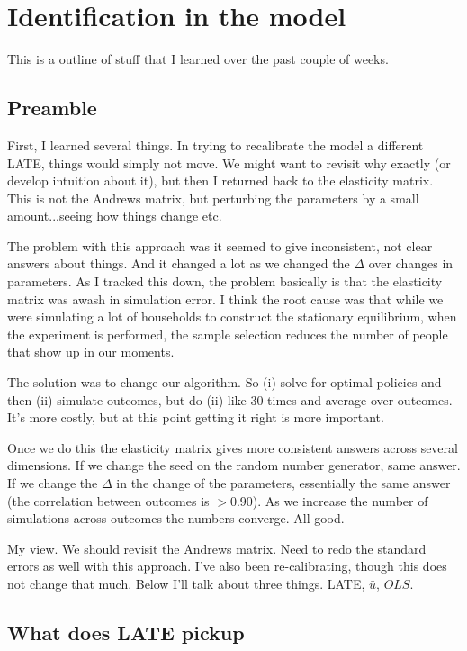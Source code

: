 \documentclass[pdftex,11pt]{article}
\begin{document}
\section{Identification in the model}

This is a outline of stuff that I learned over the past couple of weeks.

\subsection{Preamble}

First, I learned several things. In trying to recalibrate the model a different LATE, things would simply not move. We might want to revisit why exactly (or develop intuition about it), but then I returned back to the elasticity matrix. This is not the Andrews matrix, but perturbing the parameters by a small amount...seeing how things change etc.

The problem with this approach was it seemed to give inconsistent, not clear answers about things. And it changed a lot as we changed the $\Delta$  over changes in parameters. As I tracked this down, the problem basically is  that the elasticity matrix was awash in simulation error. I think the root cause was that while we were simulating a lot of households to construct the stationary equilibrium, when the experiment is performed, the sample selection reduces the number of people that show up in our moments. 

The solution was to change our algorithm. So (i) solve for optimal policies and then (ii) simulate outcomes, but do (ii) like 30 times and average over outcomes. It's more costly, but at this point getting it right is more important.

Once we do this the elasticity matrix gives more consistent answers across several dimensions. If we change the seed on the random number generator, same answer. If we change the $\Delta$ in the change of the parameters, essentially the same answer (the correlation between outcomes is $> 0.90$). As we increase the number of simulations across outcomes the numbers converge. All good. 

My view. We should revisit the Andrews matrix. Need to redo the standard errors as well with this approach. I've also been re-calibrating, though this does not change that much.  Below I'll talk about three things. LATE, $\bar u$, $OLS$.

\subsection{What does LATE pickup}
\end{document}
